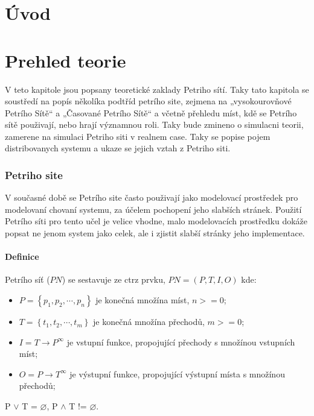 \chapter{Úvod}
\chapter{Prehled teorie}
\label{prehled}

V teto kapitole jsou popsany teoretické zaklady Petriho sítí. Taky tato kapitola se soustředí na popís několíka podtříd petrího site, zejmena na „vysokourovňové Petrího Sítě“ a „Časované Petrího Sítě“ a  včetně přehledu míst, kdě se Petrího sítě použivají, nebo hrají významnou roli. Taky bude zmineno o simulacni teorii, zamerene na simulaci Petriho siti v realnem case. Taky se popise pojem distribovanych systemu a ukaze se jejich vztah z Petriho siti.

\subsection{Petriho site}
V současné době se Petrího site často použivají jako modelovací prostředek pro modelovaní chovaní systemu, za účelem pochopení jeho slabších stránek. Použití Petrího síti pro tento učel je velice vhodne, malo modelovacích prostředku dokáže popsat ne jenom system jako celek, ale i zjistit slabší stránky jeho implementace.
\subsubsection{Definice}

Petrího síť ($PN$) se sestavuje ze ctrz prvku, $PN = \left(P, T, I, O\right)$ kde:
  \begin{itemize}
    \item $P = \left\{p_1, p_2, \cdots , p_n\right\}$ je konečná množína míst, $n >= 0$; \\
    \item $T = \left\{t_1, t_2, \cdots , t_m\right\}$ je konečná množína přechodů, $m >= 0$; \\
    \item $I = T \rightarrow P^\infty$ je vstupní funkce, propojující přechody s množínou vstupních míst; \\
    \item $O = P \rightarrow T^\infty$ je výstupní funkce, propojující výstupní místa s množínou přechodů; \\
  \end{itemize}
P $\vee$ T = $\varnothing$, P $\wedge$ T != $\varnothing$. 

